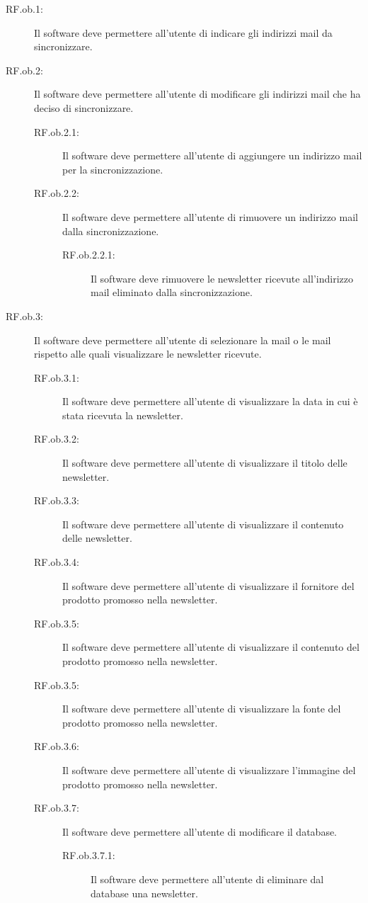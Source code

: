 \begin{description}
\item[RF.ob.1:] Il software deve permettere all\textquoteright{}utente di indicare gli indirizzi mail da sincronizzare.
\item[RF.ob.2:] Il software deve permettere all\textquoteright{}utente di modificare gli indirizzi mail che ha deciso di sincronizzare.
	\begin{description}
	\item[RF.ob.2.1:] Il software deve permettere all\textquoteright{}utente di aggiungere un indirizzo mail per la sincronizzazione.
	\item[RF.ob.2.2:] Il software deve permettere all\textquoteright{}utente di rimuovere un indirizzo mail dalla sincronizzazione.
		\begin{description}
		\item[RF.ob.2.2.1:] Il software deve rimuovere le newsletter ricevute all\textquoteright{}indirizzo mail eliminato dalla sincronizzazione.
		\end{description}
	\end{description}
\item[RF.ob.3:] Il software deve permettere all\textquoteright{}utente di selezionare la mail o le mail rispetto alle quali visualizzare le newsletter ricevute.
	\begin{description}
	\item[RF.ob.3.1:] Il software deve permettere all\textquoteright{}utente di visualizzare la data in cui \`{e} stata ricevuta la newsletter.
	\item[RF.ob.3.2:] Il software deve permettere all\textquoteright{}utente di visualizzare il titolo delle newsletter.
	\item[RF.ob.3.3:] Il software deve permettere all\textquoteright{}utente di visualizzare il contenuto delle newsletter.
	\item[RF.ob.3.4:] Il software deve permettere all\textquoteright{}utente di visualizzare il fornitore del prodotto promosso nella newsletter.
	\item[RF.ob.3.5:] Il software deve permettere all\textquoteright{}utente di visualizzare il contenuto del prodotto promosso nella newsletter.
	\item[RF.ob.3.5:] Il software deve permettere all\textquoteright{}utente di visualizzare la fonte del prodotto promosso nella newsletter.
	\item[RF.ob.3.6:] Il software deve permettere all\textquoteright{}utente di visualizzare l\textquoteright{}immagine del prodotto promosso nella newsletter.
	\item[RF.ob.3.7:] Il software deve permettere all\textquoteright{}utente di modificare il database.
		\begin{description}
		\item[RF.ob.3.7.1:] Il software deve permettere all\textquoteright{}utente di eliminare dal database una newsletter.
		\end{description}
	\end{description}
\end{description}

